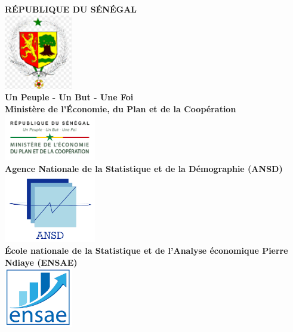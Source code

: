 \documentclass[
]{article}
\author{}
\date{\vspace{-2.5em}}
\begin{document}
\begin{titlepage}
    \begin{center}
        \textbf{\LARGE RÉPUBLIQUE DU SÉNÉGAL}\\[0.1cm]
        \includegraphics[width=3cm]{"../Documents/Logo SEN.png"} \\[0.1cm]  
        \textbf{\large Un Peuple - Un But - Une Foi}\\[0.2cm]
        
        \textbf{\LARGE Ministère de l'Économie, du Plan et de la Coopération}\\[0.1cm]
        \includegraphics[width=4cm]{"../Documents/Logo-MP.png"} \\[0.1cm] 
        
        \textbf{\large Agence Nationale de la Statistique et de la Démographie (ANSD)}\\[0.2cm]
        
        \includegraphics[width=4cm]{"../Documents/Logo-ANSD.png"} \\[0.1cm]  
        
        \textbf{\large École nationale de la Statistique et de l'Analyse économique Pierre Ndiaye (ENSAE)}\\[0.4cm]
        \includegraphics[width=3cm]{"../Documents/ENSAE-Dakar-logo.png"} \\[0.1cm]
        

\end{center}
\end{titlepage}
\end{document}
